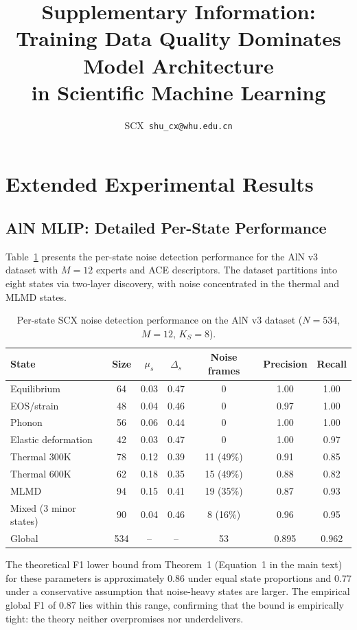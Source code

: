 \documentclass[11pt,a4paper]{article}
\title{Supplementary Information: \\ Training Data Quality Dominates Model Architecture \\ in Scientific Machine Learning}
\author{SCX\ \texttt{shu_cx@whu.edu.cn}}
\begin{document}
\maketitle

\tableofcontents

\section{Extended Experimental Results}
\label{sec:S1}

\subsection{AlN MLIP: Detailed Per-State Performance}

Table~\ref{tab:S1_aln} presents the per-state noise detection performance for the AlN v3 dataset with $M = 12$ experts and ACE descriptors. The dataset partitions into eight states via two-layer discovery, with noise concentrated in the thermal and MLMD states.

\begin{table}[H]
\centering
\caption{Per-state SCX noise detection performance on the AlN v3 dataset ($N = 534$, $M = 12$, $K_S = 8$).}
\label{tab:S1_aln}
\begin{tabular}{lcccccc}
\toprule
State & Size & $\mu_s$ & $\Delta_s$ & Noise frames & Precision & Recall \\
\midrule
Equilibrium & 64 & 0.03 & 0.47 & 0 & 1.00 & 1.00 \\
EOS/strain & 48 & 0.04 & 0.46 & 0 & 0.97 & 1.00 \\
Phonon & 56 & 0.06 & 0.44 & 0 & 1.00 & 1.00 \\
Elastic deformation & 42 & 0.03 & 0.47 & 0 & 1.00 & 0.97 \\
Thermal 300K & 78 & 0.12 & 0.39 & 11 (49\%) & 0.91 & 0.85 \\
Thermal 600K & 62 & 0.18 & 0.35 & 15 (49\%) & 0.88 & 0.82 \\
MLMD & 94 & 0.15 & 0.41 & 19 (35\%) & 0.87 & 0.93 \\
Mixed (3 minor states) & 90 & 0.04 & 0.46 & 8 (16\%) & 0.96 & 0.95 \\
\midrule
Global & 534 & -- & -- & 53 & 0.895 & 0.962 \\
\bottomrule
\end{tabular}
\end{table}

The theoretical F1 lower bound from Theorem~1 (Equation~1 in the main text) for these parameters is approximately 0.86 under equal state proportions and 0.77 under a conservative assumption that noise-heavy states are larger. The empirical global F1 of 0.87 lies within this range, confirming that the bound is empirically tight: the theory neither overpromises nor underdelivers.
\end{document}
